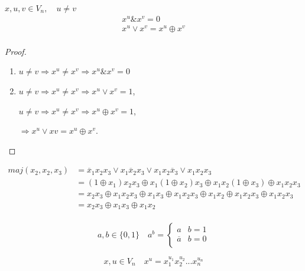 \begin{lemma}
    $x, u, v \in V_n, \quad u \neq v$
    \begin{gather*}
        x^u \& x^v = 0 \\
        x^u \vee x^v = x^u \oplus x^v \\
    \end{gather*}
\end{lemma}
\begin{proof}
    \begin{enumerate}
        \item $u \neq v \Rightarrow x^u \neq x^v \Rightarrow x^u \& x^v = 0$
        \item $u \neq v \Rightarrow x^u \neq x^v \Rightarrow x^u \vee x^v = 1$,

        $u \neq v \Rightarrow x^u \neq x^v \Rightarrow x^u \oplus x^v = 1$,

        $\Rightarrow x^u \vee xv = x^u \oplus x^v$.
    \end{enumerate}
\end{proof}

\begin{example}
    \begin{equation*}
        \begin{split}
            maj(x_2, x_2, x_3)
            &= \overline{x}_1 x_2 x_3 \vee x_1 \overline{x}_2 x_3 \vee x_1 x_2 \overline{x}_3 \vee x_1 x_2 x_3 \\
            &= (1 \oplus x_1) x_2 x_3 \oplus x_1 (1 \oplus x_2) x_3 \oplus x_1 x_2 (1 \oplus x_3) \oplus x_1 x_2 x_3 \\
            &= x_2 x_3 \oplus x_1 x_2 x_3 \oplus x_1 x_3 \oplus x_1 x_2 x_3 \oplus x_1 x_2  \oplus x_1 x_2 x_3 \oplus x_1 x_2 x_3 \\
            &= x_2 x_3 \oplus x_1 x_3 \oplus x_1 x_2 \\
        \end{split}
    \end{equation*}
\end{example}

\begin{equation*}
    a, b \in \{0, 1\} \quad a^b = \left\{ \begin{array}{cc}
        a & b = 1 \\
        \overline{a} & b = 0 \\
    \end{array} \right.
\end{equation*}

\begin{equation*}
    x, u \in V_n \quad x^u = x_1^{u_1} x_2^{u_2}  ... x_n^{u_n}
\end{equation*}

